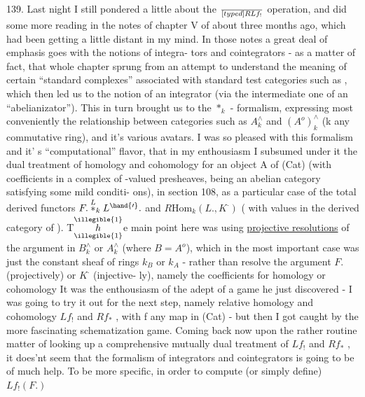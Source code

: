 139. Last night I still pondered a little about the $\over[typed]{R}{L}f_{!}$ operation,
and did some more reading in the notes of chapter V of about three
months ago, which had been getting a little distant in my mind. In
those notes a great deal of emphasis goes with the notions of integra-%
tors and cointegrators - as a matter of fact,  that whole
chapter sprung from an attempt to understand the meaning  of
certain ``standard complexes'' associated with standard test categories
such as \hand{$\Delta$}, which then led us to the notion of an integrator (via the
intermediate one of an ``abelianizator''). This in turn brought us to
the $*_{k}$ - formalism, expressing most conveniently the relationship
between categories such as $A^{\wedge}_{k}$ and $(A^{o})^{\wedge}_{k}$ (k any commutative ring),
and it's various avatars. I was so pleased with this formalism and it'%
s ``computational'' flavor, that in my enthousiasm I subsumed under it
the dual treatment of homology and cohomology for an
object A of (Cat) (with coefficients in a complex of -valued
presheaves, being an abelian category satisfying some mild conditi-%
ons), in section 108, as a particular case of the total derived
functors $F.\overset{L}{*}_{k}L^{\hand{\prime}}.$ and $R\mathrm{Hom}_{k}(L.,K^{\cdot})$ ( with values in the derived
category of  ). T$\overset{\illegible{1}}{\underset{\illegible{1}}{h}}$e main point here was using \uline{projective resolutions}
of the argument  in $B^{\wedge}_{k}$ or $A^{\wedge}_{k}$ (where $B=A^{o}$), which in 
the most important case was just the constant sheaf of rings $k_{B}$ or $k_{A}$
- rather than resolve the argument $F.$ (projectively) or $K^{\cdot}$ (injective-%
ly), namely the coefficients for homology or cohomology
It was the enthousiasm of the adept of a game he just discovered -
I was going to try it out for the next step, namely relative homology
and cohomology $Lf_{!}$ and $Rf_{*}$ , with f any map in (Cat)\deleted{,} - but then I
got caught by the more fascinating schematization game. Coming back
now upon the rather routine matter of looking up a comprehensive
mutually dual treatment of $Lf_{!}$ and $Rf_{*}$ , it does'nt seem that the
formalism of integrators and cointegrators is going to be of much help.
To be more specific, in order to compute (or simply define) $Lf_{!}(F.)$


